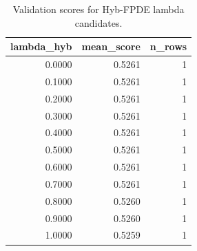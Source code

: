 \begin{table}[t]
\caption{Validation scores for Hyb-FPDE lambda candidates.}
\label{tab:lambda_distribution_computed}
\centering
\begin{tabular}{rrr}
\toprule
lambda\_hyb & mean\_score & n\_rows \\
\midrule
0.0000 & 0.5261 & 1 \\
0.1000 & 0.5261 & 1 \\
0.2000 & 0.5261 & 1 \\
0.3000 & 0.5261 & 1 \\
0.4000 & 0.5261 & 1 \\
0.5000 & 0.5261 & 1 \\
0.6000 & 0.5261 & 1 \\
0.7000 & 0.5261 & 1 \\
0.8000 & 0.5260 & 1 \\
0.9000 & 0.5260 & 1 \\
1.0000 & 0.5259 & 1 \\
\bottomrule
\end{tabular}

\end{table}
